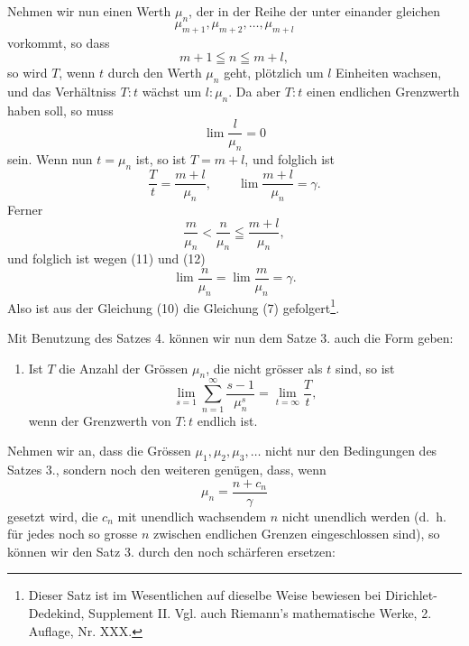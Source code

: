 \documentclass[11pt]{article}
\begin{document}
Nehmen wir nun einen Werth $\mu_n$, der in der Reihe der unter einander gleichen
\[
\mu_{m+1},\mu_{m+2},\ldots,\mu_{m+l}
\]
vorkommt, so dass
\[
m+1\leqq n\leqq m+l,
\]
so wird $T$, wenn $t$ durch den Werth $\mu_n$ geht, plötzlich um $l$ Einheiten wachsen, und das Verhältniss $T:t$ wächst um $l:\mu_n$. Da aber $T:t$ einen endlichen Grenzwerth haben soll, so muss
\begin{equation}
\lim\frac{l}{\mu_n}=0
\tag{11}
\end{equation}
sein. Wenn nun $t=\mu_n$ ist, so ist $T=m+l$, und folglich ist
\begin{equation}
\frac{T}{t}=\frac{m+l}{\mu_n},\qquad
\lim\frac{m+l}{\mu_n}=\gamma.
\tag{12}
\end{equation}
Ferner
\[
\frac{m}{\mu_n}<\frac{n}{\mu_n}\leqq\frac{m+l}{\mu_n},
\]
und folglich ist wegen (11) und (12)
\[
\lim\frac{n}{\mu_n}=\lim\frac{m}{\mu_n}=\gamma.
\]
Also ist aus der Gleichung (10) die Gleichung (7) gefolgert\footnote{Dieser Satz ist im Wesentlichen auf dieselbe Weise bewiesen bei Dirichlet-Dedekind, Supplement II. Vgl. auch Riemann's mathematische Werke, 2. Auflage, Nr. XXX.}.

Mit Benutzung des Satzes 4. können wir nun dem Satze 3. auch die Form geben:

\begin{enumerate}[label=\textbf{\arabic*.},leftmargin=2.2em,start=5]
\item Ist $T$ die Anzahl der Grössen $\mu_n$, die nicht grösser als $t$ sind, so ist
\begin{equation}
\lim_{s=1}\sum_{n=1}^{\infty}\frac{s-1}{\mu_n^s}=\lim_{t=\infty}\frac{T}{t},
\tag{13}
\end{equation}
wenn der Grenzwerth von $T:t$ endlich ist.
\end{enumerate}

Nehmen wir an, dass die Grössen $\mu_1,\mu_2,\mu_3,\ldots$ nicht nur den Bedingungen des Satzes 3., sondern noch den weiteren genügen, dass, wenn
\begin{equation}
\mu_n=\frac{n+c_n}{\gamma}
\tag{14}
\end{equation}
gesetzt wird, die $c_n$ mit unendlich wachsendem $n$ nicht unendlich werden (d.\ h. für jedes noch so grosse $n$ zwischen endlichen Grenzen eingeschlossen sind), so können wir den Satz 3. durch den noch schärferen ersetzen:
\end{document}
